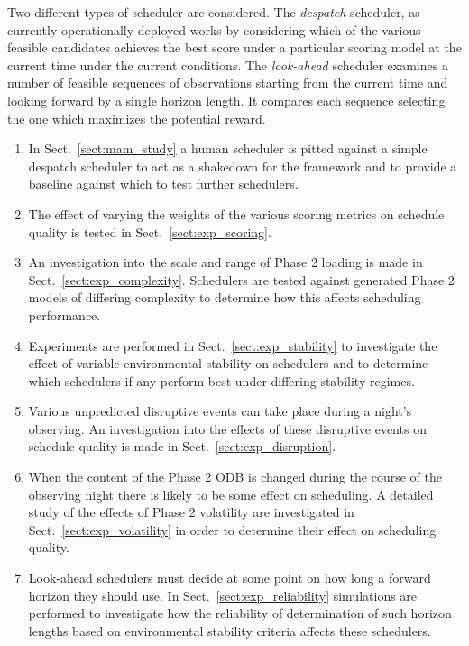 Two different types of scheduler are considered. The \emph{despatch} scheduler, as currently operationally deployed works by considering which of the various feasible candidates achieves the best score under a particular scoring model at the current time under the current conditions. The \emph{look-ahead} scheduler examines a number of feasible sequences of observations starting from the current time and looking forward by a single horizon length. It compares each sequence selecting the one which maximizes the potential reward.

\begin{enumerate}
\item In Sect.~\ref{sect:mam_study} a human scheduler is pitted against a simple despatch scheduler to act as a shakedown for the framework and to provide a baseline against which to test further schedulers.

\item The effect of varying the weights of the various scoring metrics on schedule quality is tested in Sect.~\ref{sect:exp_scoring}.

\item An investigation into the scale and range of Phase 2 loading is made in Sect.~\ref{sect:exp_complexity}. Schedulers are tested against generated Phase 2 models of differing complexity to determine how this affects scheduling performance.

\item Experiments are performed in Sect.~\ref{sect:exp_stability} to investigate the effect of variable environmental stability on schedulers and to determine which schedulers if any perform best under differing stability regimes.

\item Various unpredicted disruptive events can take place during a night's observing. An investigation into the effects of these disruptive events on schedule quality is made in Sect.~\ref{sect:exp_disruption}.

\item When the content of the Phase 2 ODB is changed during the course of the observing night there is likely to be some effect on scheduling. A detailed study of the effects of Phase 2 volatility are investigated in Sect.~\ref{sect:exp_volatility} in order to determine their effect on scheduling quality.


\item Look-ahead schedulers must decide at some point on how long a forward horizon they should use. In Sect.~\ref{sect:exp_reliability} simulations are performed to investigate how the reliability of determination of such horizon lengths based on environmental stability criteria affects these schedulers.



\end{enumerate}
